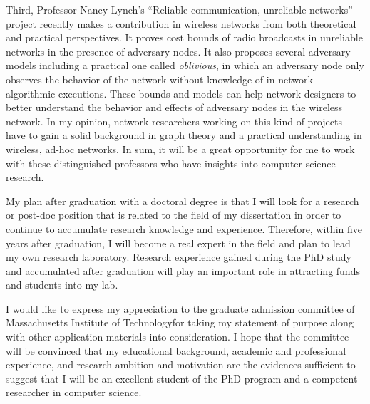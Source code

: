 \documentclass[a4paper,10pt]{report}
\newcommand{\university}{Massachusetts Institute of Technology}
\begin{document}
\vspace{0.2cm}
Third, Professor Nancy Lynch's ``Reliable communication, unreliable networks'' project recently makes a contribution in wireless networks from both theoretical and practical perspectives. It proves cost bounds of radio broadcasts in unreliable networks in the presence of adversary nodes. It also proposes several adversary models including a practical one called \textit{oblivious}, in which an adversary node only observes the behavior of the network without knowledge of in-network algorithmic executions. These bounds and models can help network designers to better understand the behavior and effects of adversary nodes in the wireless network. In my opinion, network researchers working on this kind of projects have to gain a solid background in graph theory and a practical understanding in wireless, ad-hoc networks. In sum, it will be a great opportunity for me to work with these distinguished professors who have insights into computer science research.

\vspace{0.2cm}
My plan after graduation with a doctoral degree is that I will look for a research or post-doc position that is related to the field of my dissertation in order to continue to accumulate research knowledge and experience. Therefore, within five years after graduation, I will become a real expert in the field and plan to lead my own research laboratory. Research experience gained during the PhD study and accumulated after graduation will play an important role in attracting funds and students into my lab.

\vspace{0.2cm}
I would like to express my appreciation to the graduate admission committee of \university \space for taking my statement of purpose along with other application materials into consideration. I hope that the committee will be convinced that my educational background, academic and professional experience, and research ambition and motivation are the evidences sufficient to suggest that I will be an excellent student of the PhD program and a competent researcher in computer science.
\end{document}
